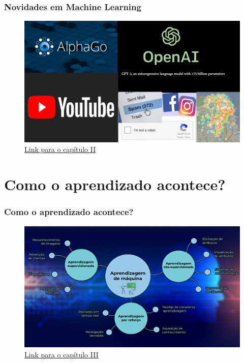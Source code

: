 \documentclass{beamer}
\begin{document}
\begin{frame}

    \frametitle{Novidades em Machine Learning}
    \begin{figure}[ht]
        \centering
        \includegraphics[scale=0.5]{Capitulo2.png}
        \caption{\href{run:./capitulos/Capitulo_02/Capitulo02.pdf}{Link para o capítulo II}}
    \end{figure}

\end{frame}

\section{Como o aprendizado acontece?}

\begin{frame}

    \frametitle{Como o aprendizado acontece?}
    \begin{figure}[ht]
        \centering
        \includegraphics[scale=0.5]{Capitulo3.png}
        \caption{\href{run:./capitulos/Capitulo_03/Capitulo03.pdf}{Link para o capítulo III}}
    \end{figure}

\end{frame}
\end{document}
